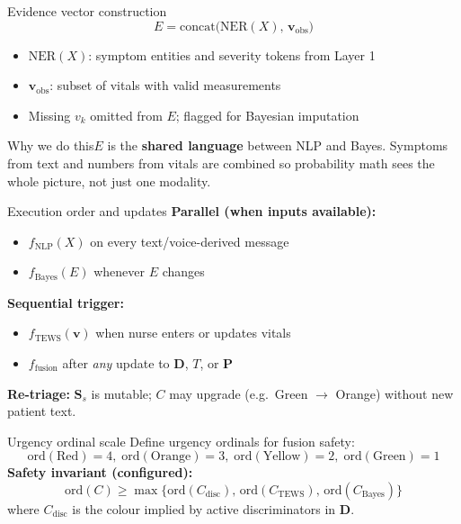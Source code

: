 \documentclass[aspectratio=169,11pt]{beamer}
\newcommand{\why}[1]{\begin{block}{Why we do this}\small #1\end{block}}
\begin{document}
\begin{frame}{Evidence vector construction}
	\[
	E = \mathrm{concat}\bigl(\mathrm{NER}(X),\, \mathbf{v}_{\text{obs}}\bigr)
	\]
	\begin{itemize}
		\item $\mathrm{NER}(X)$: symptom entities and severity tokens from Layer 1
		\item $\mathbf{v}_{\text{obs}}$: subset of vitals with valid measurements
		\item Missing $v_k$ omitted from $E$; flagged for Bayesian imputation
	\end{itemize}

	\why{$E$ is the \textbf{shared language} between NLP and Bayes. Symptoms from text and numbers from vitals are combined so probability math sees the whole picture, not just one modality.}
\end{frame}

\begin{frame}{Execution order and updates}
	\textbf{Parallel (when inputs available):}
	\begin{itemize}
		\item $f_{\text{NLP}}(X)$ on every text/voice-derived message
		\item $f_{\text{Bayes}}(E)$ whenever $E$ changes
	\end{itemize}

	\textbf{Sequential trigger:}
	\begin{itemize}
		\item $f_{\text{TEWS}}(\mathbf{v})$ when nurse enters or updates vitals
		\item $f_{\text{fusion}}$ after \textit{any} update to $\mathbf{D}$, $T$, or $\mathbf{P}$
	\end{itemize}

	\textbf{Re-triage:} $\mathbf{S}_s$ is mutable; $C$ may upgrade (e.g.\ Green $\to$ Orange) without new patient text.
\end{frame}

\begin{frame}{Urgency ordinal scale}
	Define urgency ordinals for fusion safety:
	\[
	\mathrm{ord}(\text{Red})=4,\;
	\mathrm{ord}(\text{Orange})=3,\;
	\mathrm{ord}(\text{Yellow})=2,\;
	\mathrm{ord}(\text{Green})=1
	\]
	\textbf{Safety invariant (configured):}
	\[
	\mathrm{ord}(C) \geq \max\bigl\{\mathrm{ord}(C_{\text{disc}}),\, \mathrm{ord}(C_{\text{TEWS}}),\, \mathrm{ord}(C_{\text{Bayes}})\bigr\}
	\]
	where $C_{\text{disc}}$ is the colour implied by active discriminators in $\mathbf{D}$.
\end{frame}
\end{document}
